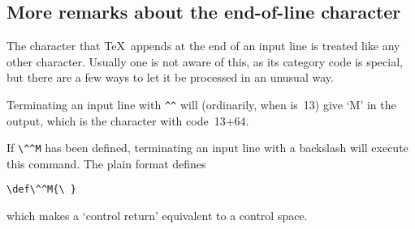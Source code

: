 \documentclass{book}
\begin{document}
\subsection{More remarks about the end-of-line character}

The character that \TeX\ appends at the end of an input line
is treated like any other character. Usually one is not aware
of this, as its category code is special, but there are a few
ways to let it be processed in an unusual way.

\begin{example} Terminating an input line with \verb>^^> will
(ordinarily, when  is~13) give `M' in the output, 
which is the 
\ascii{} character with code~13+64.
\end{example}

\begin{example} If \verb>\^^M> has been defined,
terminating an input line with a backslash will execute this command.
The plain format defines
\begin{verbatim}
\def\^^M{\ }
\end{verbatim}
which makes a `control return' equivalent to a control space.
\end{example}

\end{document}
